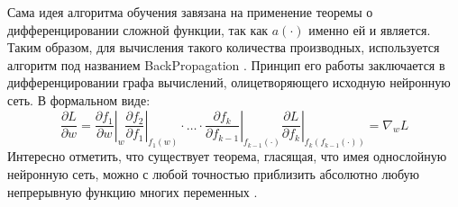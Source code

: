 Сама идея алгоритма обучения завязана на применение теоремы о дифференцировании сложной функции, так как $a(\cdot)$ именно ей и является. Таким образом, для вычисления такого количества производных, используется алгоритм под названием BackPropagation \cite{linnainmaa1970representation}. Принцип его работы заключается в дифференцировании графа вычислений, олицетворяющего исходную нейронную сеть. В формальном виде:
\begin{equation}
	\frac{\partial L}{\partial w} = \left. \frac{\partial f_1}{\partial w} \right\rvert_w \left. \frac{\partial f_2}{\partial f_1} \right\rvert_{f_1(w)} \cdot \ldots \cdot \left. \frac{\partial f_k}{\partial f_{k - 1}} \right\rvert_{f_{k - 1}(\cdot)} \left. \frac{\partial L}{\partial f_k} \right\rvert_{f_k\left(f_{k - 1}(\cdot)\right)} = \nabla_w L
\end{equation}
Интересно отметить, что существует теорема, гласящая, что имея однослойную нейронную сеть, можно с любой точностью приблизить абсолютно любую непрерывную функцию многих переменных \cite{cybenko1989approximation}.

